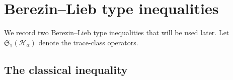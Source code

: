 \documentclass{amsart}
\theoremstyle{definition}
\theoremstyle{remark}
\numberwithin{equation}{section}
\newcommand{\ip}[2]{\left\langle {#1} , {#2} \right\rangle} %
\begin{document}

\section{Berezin--Lieb type inequalities}

We record two Berezin--Lieb type inequalities that will be used later. Let $\mathfrak{S}_{1}(\mathcal{H}_{\alpha})$ denote the trace-class operators.  

\subsection*{The classical inequality}
\end{document}

